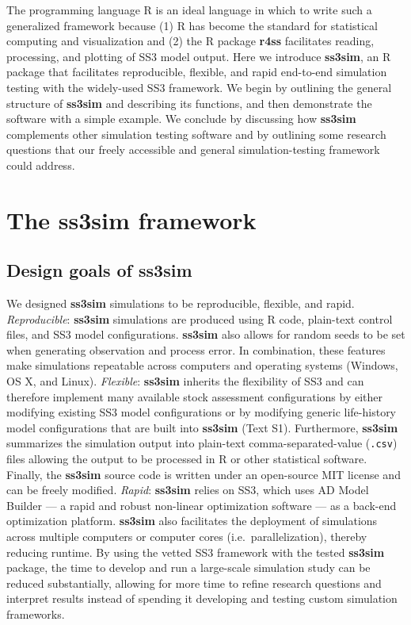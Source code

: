 The programming language \textsf{R} \cite{rcoreteam2013} is an ideal language
in which to write such a generalized framework because (1) \textsf{R} has
become the standard for statistical computing and visualization and (2) the
\textsf{R} package \textbf{r4ss} \cite{r4ss2013} facilitates reading,
processing, and plotting of SS3 model output. Here we introduce
\textbf{ss3sim}, an \textsf{R} package that facilitates reproducible,
flexible, and rapid end-to-end simulation testing with the widely-used SS3
framework. We begin by outlining the general structure of \textbf{ss3sim} and
describing its functions, and then demonstrate the software with a simple
example. We conclude by discussing how \textbf{ss3sim} complements other
simulation testing software and by outlining some research questions that our
freely accessible and general simulation-testing framework could address.

\section*{The ss3sim framework}

\subsection*{Design goals of ss3sim}

We designed \textbf{ss3sim} simulations to be reproducible,
flexible, and rapid. \emph{Reproducible}: \textbf{ss3sim} simulations are
produced using \textsf{R} code, plain-text control files, and SS3 model
configurations. \textbf{ss3sim} also allows for random seeds to be set when
generating observation and process error. In combination, these features make
simulations repeatable across computers and operating systems (Windows, OS X,
and Linux). \emph{Flexible}: \textbf{ss3sim} inherits the flexibility of SS3
and can therefore implement many available stock assessment configurations by
either modifying existing SS3 model configurations or by modifying generic
life-history model configurations that are built into \textbf{ss3sim} (Text
S1). Furthermore, \textbf{ss3sim} summarizes the simulation output into
plain-text comma-separated-value (\texttt{.csv}) files allowing the output to
be processed in \textsf{R} or other statistical software. Finally, the
\textbf{ss3sim} source code is written under an open-source MIT license and can
be freely modified. \emph{Rapid}: \textbf{ss3sim} relies on SS3, which uses AD
Model Builder \cite{fournier2012} --- a rapid and robust
non-linear optimization software \cite{bolker2013} --- as a back-end
optimization platform. \textbf{ss3sim} also facilitates the deployment of
simulations across multiple computers or computer cores (i.e.~parallelization),
thereby reducing runtime. By using the vetted SS3 framework with the
tested \textbf{ss3sim} package, the time to develop and run a large-scale
simulation study can be reduced substantially, allowing for more time to
refine research questions and interpret results instead of spending it
developing and testing custom simulation frameworks.

